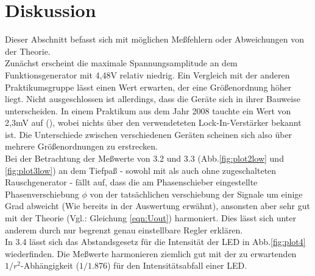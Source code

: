 \section{Diskussion}
\label{sec:Diskussion}
Dieser Abschnitt befasst sich mit möglichen Meßfehlern oder Abweichungen
von der Theorie.\\

Zunächst erscheint die maximale Spannungsamplitude an dem Funktionsgenerator mit
4,48V relativ niedrig. Ein Vergleich mit der anderen Praktikumsgruppe lässt
einen Wert erwarten, der eine Größenordnung höher liegt. Nicht ausgeschlossen
ist allerdings, dass die Geräte sich in ihrer Bauweise unterscheiden. In
einem Praktikum aus dem Jahr 2008 tauchte ein Wert von 2,3mV
auf (\cite{Protokoll}), wobei nichts
über den verwendeteten Lock-In-Verstärker bekannt ist. Die Unterschiede
zwischen verschiedenen Geräten scheinen sich also über mehrere Größenordnungen
zu erstrecken.\\

Bei der Betrachtung der Meßwerte von 3.2 und 3.3 (Abb.\ref{fig:plot2low} und
\ref{fig:plot3low})
an dem Tiefpaß - sowohl mit als auch ohne zugeschalteten
Rauschgenerator - fällt auf, dass die am Phasenschieber eingestellte
Phasenverschiebung $\phi$ von der tatsächlichen verschiebung der Signale
um einige Grad abweicht (Wie bereits in der Auswertung erwähnt), ansonsten
aber sehr gut mit der Theorie (Vgl.: Gleichung \ref{eqn:Uout}) harmoniert.
Dies lässt sich unter anderem durch nur begrenzt genau einstellbare Regler
erklären.\\

In 3.4 lässt sich das Abstandsgesetz für die Intensität der LED in
Abb.\ref{fig:plot4} wiederfinden. Die Meßwerte harmonieren ziemlich gut mit der
zu erwartenden $1/r^2$-Abhängigkeit ($1/1.876$) für den Intensitätsabfall
einer LED.
